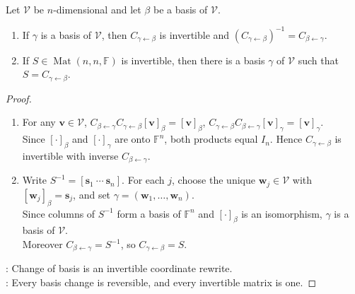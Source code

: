 \begin{theorem} \label{thm:change-of-basis-matrices} \\
Let $\mathcal{V}$ be $n$-dimensional and let $\beta$ be a basis of $\mathcal{V}$.
\begin{enumerate}[label=(\roman*)]
\setlength{\itemsep}{0pt}
\item If $\gamma$ is a basis of $\mathcal{V}$, then $C_{\gamma \leftarrow \beta}$ is invertible and $(C_{\gamma \leftarrow \beta})^{-1}=C_{\beta \leftarrow \gamma}$.
\item If $S\in\operatorname{Mat}(n,n,\mathbb{F})$ is invertible, then there is a basis $\gamma$ of $\mathcal{V}$ such that $S=C_{\gamma \leftarrow \beta}$.
\end{enumerate}
\begin{proof}
\begin{enumerate}[label=(\roman)*.]
\setlength{\itemsep}{0pt}
\item[$(i)$] For any $\mathbf{v}\in\mathcal{V}$, $C_{\beta \leftarrow \gamma}C_{\gamma \leftarrow \beta}[\mathbf{v}]_{\beta}=[\mathbf{v}]_{\beta}$, $C_{\gamma \leftarrow \beta}C_{\beta \leftarrow \gamma}[\mathbf{v}]_{\gamma}=[\mathbf{v}]_{\gamma}$.\\
Since $[\cdot]_{\beta}$ and $[\cdot]_{\gamma}$ are onto $\mathbb{F}^n$, both products equal $I_n$. Hence $C_{\gamma \leftarrow \beta}$ is invertible with inverse $C_{\beta \leftarrow \gamma}$.
\item[$(ii)$] Write $S^{-1}=[\mathbf{s}_1\ \cdots\ \mathbf{s}_n]$. For each $j$, choose the unique $\mathbf{w}_j\in\mathcal{V}$ with $[\mathbf{w}_j]_{\beta}=\mathbf{s}_j$, and set $\gamma=(\mathbf{w}_1,\ldots,\mathbf{w}_n)$.\\
Since columns of $S^{-1}$ form a basis of $\mathbb{F}^n$ and $[\cdot]_{\beta}$ is an isomorphism, $\gamma$ is a basis of $\mathcal{V}$.\\
Moreover $C_{\beta \leftarrow \gamma}=S^{-1}$, so $C_{\gamma \leftarrow \beta}=S$.
\end{enumerate}
: Change of basis is an invertible coordinate rewrite.\\
: Every basis change is reversible, and every invertible matrix is one.
\end{proof}
\end{theorem}

